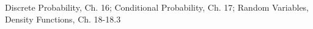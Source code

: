 \documentclass[handout]{mcs}
\begin{document}
\renewcommand{\reading}
{Chapter~\bref{probability_chap}.\ \emph{Discrete Probability}.
 Chapter~\bref{chap:cond_prob}.\ \emph{Conditional Probability}.
 Chapter~\bref{ran_var_chap}.\ \emph{Random Variables, Density Functions}. }



\begin{staffnotes}
Discrete Probability, Ch. 16; Conditional Probability, Ch. 17;
Random Variables, Density Functions, Ch. 18-18.3
\end{staffnotes}









\end{document}
